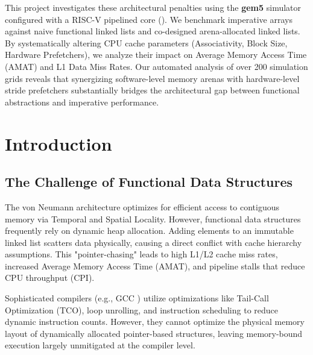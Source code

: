 \documentclass[12pt, a4paper]{report}
\begin{document}
This project investigates these architectural penalties using the \textbf{gem5} simulator configured with a RISC-V pipelined core (). We benchmark imperative arrays against naive functional linked lists and co-designed arena-allocated linked lists. By systematically altering CPU cache parameters (Associativity, Block Size, Hardware Prefetchers), we analyze their impact on Average Memory Access Time (AMAT) and L1 Data Miss Rates. Our automated analysis of over 200 simulation grids reveals that synergizing software-level memory arenas with hardware-level stride prefetchers substantially bridges the architectural gap between functional abstractions and imperative performance.

\newpage
{}
\pagestyle{fancy}
\tableofcontents
\newpage
\listoffigures
\newpage
\listoftables
\newpage

\cleardoublepage
{}

\chapter{Introduction}
\section{The Challenge of Functional Data Structures}
The von Neumann architecture optimizes for efficient access to contiguous memory via Temporal and Spatial Locality. However, functional data structures frequently rely on dynamic heap allocation. Adding elements to an immutable linked list scatters data physically, causing a direct conflict with cache hierarchy assumptions. This "pointer-chasing" leads to high L1/L2 cache miss rates, increased Average Memory Access Time (AMAT), and pipeline stalls that reduce CPU throughput (CPI).

Sophisticated compilers (e.g., GCC ) utilize optimizations like Tail-Call Optimization (TCO), loop unrolling, and instruction scheduling to reduce dynamic instruction counts. However, they cannot optimize the physical memory layout of dynamically allocated pointer-based structures, leaving memory-bound execution largely unmitigated at the compiler level.
\end{document}
